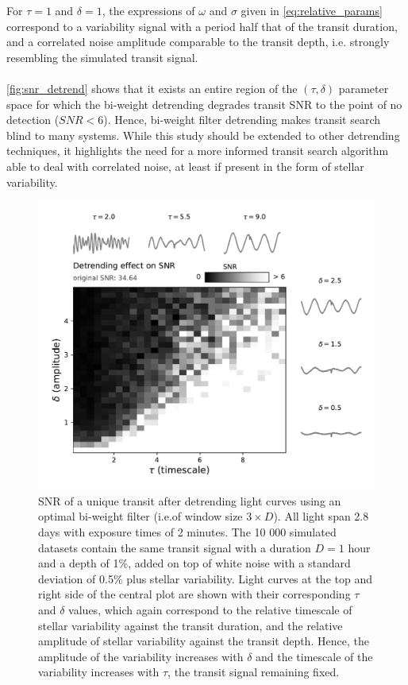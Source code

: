 \documentclass[modern]{aastex631}
\begin{document}
For $\tau=1$ and $\delta=1$, the expressions of $\omega$ and $\sigma$ given in \autoref{eq:relative_params} correspond to a variability signal with a period half that of the transit duration, and a correlated noise amplitude comparable to the transit depth, i.e. strongly resembling the simulated transit signal.\\\\
\autoref{fig:snr_detrend} shows that it exists an entire region of the $(\tau, \delta)$ parameter space for which the bi-weight detrending degrades transit SNR to the point of no detection ($SNR < 6$). Hence, bi-weight filter detrending makes transit search blind to many systems. While this study should be extended to other detrending techniques, it highlights the need for a more informed transit search algorithm able to deal with correlated noise, at least if present in the form of stellar variability.



\begin{figure}[H]
    \begin{centering}
        \includegraphics[width=0.9\linewidth]{../workflows/cleaning_snr/figures/result.pdf}
        \caption{SNR of a unique transit after detrending light curves using an optimal bi-weight filter (i.e.\;of window size $3\times D$). All light span 2.8 days with exposure times of 2 minutes. The 10 000 simulated datasets contain the same transit signal with a duration $D=1$ hour and a depth of 1\%, added on top of white noise with a standard deviation of 0.5\% plus stellar variability. Light curves at the top and right side of the central plot are shown with their corresponding $\tau$ and $\delta$ values, which again correspond to the relative timescale of stellar variability against the transit duration, and the relative amplitude of stellar variability against the transit depth. Hence, the amplitude of the variability increases with $\delta$ and the timescale of the variability increases with $\tau$, the transit signal remaining fixed.}
        \label{fig:snr_detrend}
    \end{centering}
\end{figure}
\end{document}
